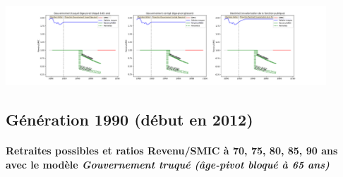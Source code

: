 \begin{center}\includegraphics[width=0.9\textwidth]{fig/SMIC_1980_22_dest_retraite.pdf}\end{center} \label{fig/SMIC_1980_22_dest_retraite.pdf} 

\newpage 
 
\subsection{Génération 1990 (début en 2012)} 

\paragraph{Retraites possibles et ratios Revenu/SMIC à 70, 75, 80, 85, 90 ans avec le modèle \emph{Gouvernement truqué (âge-pivot bloqué à 65 ans)}}  
 
